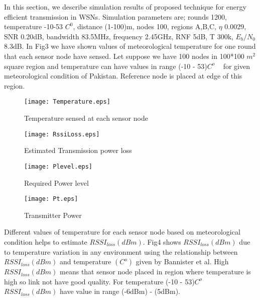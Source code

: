 \documentclass[12pt, conference, compsocconf, onecolumn, draftcls]{IEEEtran}
\begin{document}
In this section, we describe simulation results of proposed technique for energy efficient transmission in WSNs. Simulation parameters are; rounds 1200, temperature -10-53 $C^{0}$, distance (1-100)m, nodes 100, regions A,B,C, $\eta$ 0.0029, SNR 0.20dB, bandwidth 83.5MHz, frequency 2.45GHz, RNF 5dB, T 300k, $E_{b}/N_{0}$  8.3dB.  In Fig3 we have shown values of meteorological temperature for one round that each sensor node have sensed. Let suppose we have 100 nodes in 100*100 $m^{2}$ square region and temperature can have values in range (-10 - 53)$C^{o}$  ~\cite{13} for given meteorological condition of Pakistan. Reference node is placed at edge of this region.

\begin{figure}[h]
\begin{center}
\texttt{[image: Temperature.eps]}
\caption{Temperature sensed at each sensor node}
\end{center}
\end{figure}
\begin{figure}[h]
\begin{center}
\texttt{[image: RssiLoss.eps]}
\caption{Estimated Transmission power loss}
\end{center}
\end{figure}

\begin{figure}[h]
\begin{center}
\texttt{[image: Plevel.eps]}
\caption{Required Power level}
\end{center}
\end{figure}

\begin{figure}[h]
\begin{center}
\texttt{[image: Pt.eps]}
\caption{Transmitter Power}
\end{center}
\end{figure}

Different values of temperature for each sensor node based on meteorological condition  helps to estimate $RSSI_{loss}(dBm)$. Fig4 shows $RSSI_{loss}(dBm)$ due to temperature variation in any environment using the relationship between $RSSI_{loss}(dBm)$ and temperature $(C^{o})$ given by Bannister et al.  High $RSSI_{loss}(dBm)$  means that sensor node  placed in region where temperature is high so link not have good quality. For temperature (-10 - 53)$C^{o}$  $RSSI_{loss}(dBm)$ have value in range (-6dBm) - (5dBm).
\end{document}
